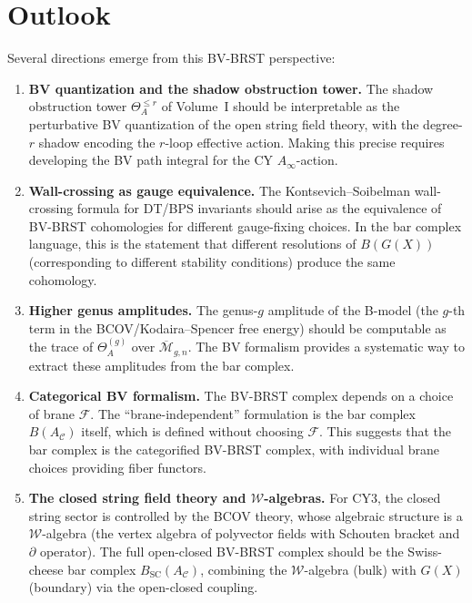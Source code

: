 \documentclass[11pt]{amsart}
\theoremstyle{plain}
\theoremstyle{definition}
\theoremstyle{remark}
\newcommand{\Ainf}{A_\infty}
\newcommand{\SC}{\mathrm{SC}}
\newcommand{\cC}{\mathcal{C}}
\newcommand{\cF}{\mathcal{F}}
\newcommand{\cM}{\mathcal{M}}
\begin{document}
\section{Outlook}
\label{sec:outlook}

Several directions emerge from this BV-BRST perspective:

\begin{enumerate}[label=(\roman*)]
 \item \textbf{BV quantization and the shadow obstruction tower.} The shadow obstruction tower $\Theta_A^{\leq r}$ of Volume~I should be interpretable as the perturbative BV quantization of the open string field theory, with the degree-$r$ shadow encoding the $r$-loop effective action. Making this precise requires developing the BV path integral for the CY $\Ainf$-action.

 \item \textbf{Wall-crossing as gauge equivalence.} The Kontsevich--Soibelman wall-crossing formula for DT/BPS invariants should arise as the equivalence of BV-BRST cohomologies for different gauge-fixing choices. In the bar complex language, this is the statement that different resolutions of $B(G(X))$ (corresponding to different stability conditions) produce the same cohomology.

 \item \textbf{Higher genus amplitudes.} The genus-$g$ amplitude of the B-model (the $g$-th term in the BCOV/Kodaira--Spencer free energy) should be computable as the trace of $\Theta_A^{(g)}$ over $\overline{\cM}_{g,n}$. The BV formalism provides a systematic way to extract these amplitudes from the bar complex.

 \item \textbf{Categorical BV formalism.} The BV-BRST complex depends on a choice of brane $\cF$. The ``brane-independent'' formulation is the bar complex $B(A_\cC)$ itself, which is defined without choosing $\cF$. This suggests that the bar complex is the categorified BV-BRST complex, with individual brane choices providing fiber functors.

 \item \textbf{The closed string field theory and $\mathcal{W}$-algebras.} For CY3, the closed string sector is controlled by the BCOV theory, whose algebraic structure is a $\mathcal{W}$-algebra (the vertex algebra of polyvector fields with Schouten bracket and $\partial$ operator). The full open-closed BV-BRST complex should be the Swiss-cheese bar complex $B_{\SC}(A_\cC)$, combining the $\mathcal{W}$-algebra (bulk) with $G(X)$ (boundary) via the open-closed coupling.
\end{enumerate}
\end{document}
